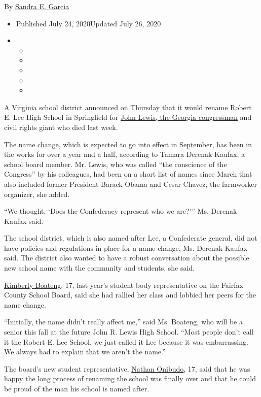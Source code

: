 By \href{https://www.nytimes.com/by/sandra-e-garcia}{Sandra E. Garcia}

\begin{itemize}
\item
  Published July 24, 2020Updated July 26, 2020
\item
  \begin{itemize}
  \item
  \item
  \item
  \item
  \item
  \end{itemize}
\end{itemize}

A Virginia school district announced on Thursday that it would rename
Robert E. Lee High School in Springfield for
\href{https://www.nytimes.com/2020/07/25/us/photos-john-lewis-memorial.html}{John
Lewis, the Georgia congressman} and civil rights giant who died last
week.

The name change, which is expected to go into effect in September, has
been in the works for over a year and a half, according to Tamara
Derenak Kaufax, a school board member. Mr. Lewis, who was called ``the
conscience of the Congress'' by his colleagues, had been on a short list
of names since March that also included former President Barack Obama
and Cesar Chavez, the farmworker organizer, she added.

``We thought, `Does the Confederacy represent who we are?''' Ms. Derenak
Kaufax said.

The school district, which is also named after Lee, a Confederate
general, did not have policies and regulations in place for a name
change, Ms. Derenak Kaufax said. The district also wanted to have a
robust conversation about the possible new school name with the
community and students, she said.

\href{https://www.fcps.edu/school-board/kimberly-boateng}{Kimberly
Boateng}, 17, last year's student body representative on the Fairfax
County School Board, said she had rallied her class and lobbied her
peers for the name change.

``Initially, the name didn't really affect me,'' said Ms. Boateng, who
will be a senior this fall at the future John R. Lewis High School.
``Most people don't call it the Robert E. Lee School, we just called it
Lee because it was embarrassing. We always had to explain that we aren't
the name.''

The board's new student representative,
\href{https://www.fcps.edu/staff/nathan-onibudo}{Nathan Onibudo}, 17,
said that he was happy the long process of renaming the school was
finally over and that he could be proud of the man his school is named
after.

